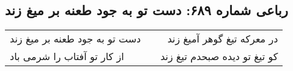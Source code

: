 \begin{center}
\section*{رباعی شماره ۶۸۹: دست تو به جود طعنه بر میغ زند}
\label{sec:0689}
\begin{longtable}{l p{0.5cm} r}
دست تو به جود طعنه بر میغ زند
&&
در معرکه تیغ گوهر آمیغ زند
\\
از کار تو آفتاب را شرمی باد
&&
کو تیغ تو دیده صبحدم تیغ زند
\\
\end{longtable}
\end{center}
